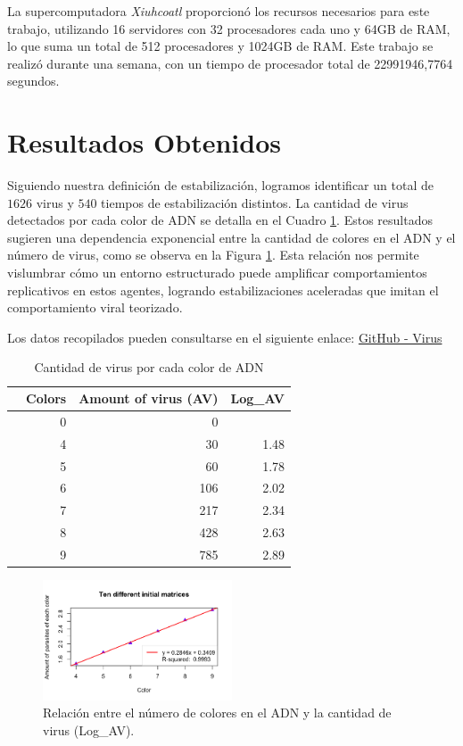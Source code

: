 \documentclass[11pt,letterpaper]{article}
\begin{document}
\begin{multicols}{2}
La supercomputadora \textit{Xiuhcoatl} proporcionó los recursos necesarios para este trabajo, utilizando 16 servidores con 32 procesadores cada uno y 64GB de RAM, lo que suma un total de 512 procesadores y 1024GB de RAM. Este trabajo se realizó durante una semana, con un tiempo de procesador total de 22991946,7764 segundos.



\section{Resultados Obtenidos}

Siguiendo nuestra definición de estabilización, logramos identificar un total de $1626$ virus y $540$ tiempos de estabilización distintos. La cantidad de virus detectados por cada color de ADN se detalla en el Cuadro \ref{tab:TB1}. Estos resultados sugieren una dependencia exponencial entre la cantidad de colores en el ADN y el número de virus, como se observa en la Figura \ref{fig:SLP}. Esta relación nos permite vislumbrar cómo un entorno estructurado puede amplificar comportamientos replicativos en estos agentes, logrando estabilizaciones aceleradas que imitan el comportamiento viral teorizado.

Los datos recopilados pueden consultarse en el siguiente enlace: 
\href{https://github.com/almuoz90/hormiga1/tree/e0f04899c7bebcd6a5a330093a3246662f58e2a8/Parasitos}{GitHub - Virus}

\begin{table}[h!]
\centering
\resizebox{8cm}{!} {
\begin{tabular}{rr|r|r}
  \hline
 & \textbf{Colors} & \textbf{Amount of virus (AV)} & \textbf{Log\_AV} \\ 
  \hline
& 0 & 0 &  \\ 
& 4 & 30 & 1.48 \\ 
& 5 & 60 & 1.78 \\ 
& 6 & 106 & 2.02 \\ 
& 7 & 217 & 2.34 \\ 
& 8 & 428 & 2.63 \\ 
& 9 & 785 & 2.89 \\ 
   \hline
\end{tabular}
}
 \caption{Cantidad de virus por cada color de ADN}
  \label{tab:TB1}
\end{table}

 \begin{figure}[h!]
        \includegraphics[width=0.5\textwidth]{reportTemplate/figures/SWPL.png}
  \caption{Relación entre el número de colores en el ADN y la cantidad de virus (Log\_AV).}
  \label{fig:SLP}
\end{figure}


\end{multicols}
\end{document}
